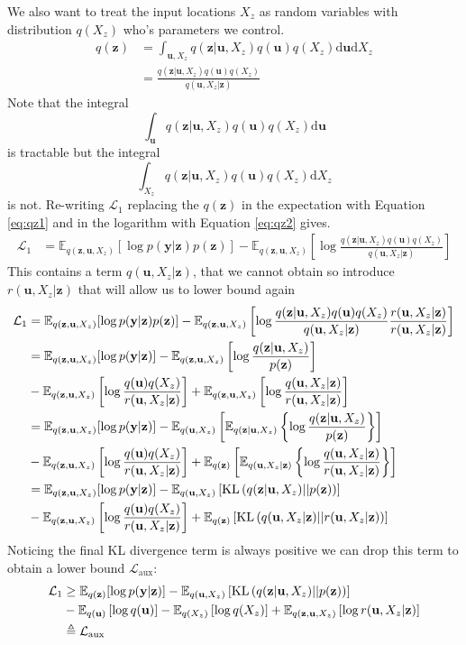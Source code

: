 \documentclass[12pt]{article}
\newcommand{\ub}{\mathbf{u}}
\newcommand{\zb}{\mathbf{z}}
\newcommand{\yb}{\mathbf{y}}
\newcommand{\dd}{\mathrm{d}}
\newcommand{\Lo}{\mathcal{L}_1}
\newcommand{\Laux}{\mathcal{L}_{\mathrm{aux}}}
\newcommand{\Ex}{\mathbb{E}}
\newcommand{\KL}{\mathrm{KL}}
\begin{document}
We also want to treat the input locations $X_z$ as random variables with distribution $q(X_z)$ who's parameters we control.
%
\begin{align}
q(\zb) &= \int_{\ub,X_z} q(\zb|\ub,X_z)q(\ub)q(X_z) \dd\ub \dd X_z \label{eq:qz1} \\
&= \frac{q(\zb|\ub,X_z)q(\ub)q(X_z)}{q(\ub,X_z|\zb)} \label{eq:qz2}
\end{align}
%
Note that the integral
%
\begin{equation}
\int_{\ub} q(\zb|\ub,X_z)q(\ub)q(X_z) \dd\ub
\end{equation}
%
is tractable but the integral
\begin{equation}
\int_{X_z} q(\zb|\ub,X_z)q(\ub)q(X_z) \dd X_z
\end{equation}
%
is not.
%
Re-writing $\Lo$ replacing the $q(\zb)$ in the expectation with Equation \ref{eq:qz1} and in the logarithm with Equation \ref{eq:qz2} gives.
%
\begin{align}
\Lo &= \Ex_{q(\zb,\ub,X_z)}[\log p(\yb|\zb)p(\zb)] - \Ex_{q(\zb,\ub,X_z)}\left[\log\frac{q(\zb|\ub,X_z)q(\ub)q(X_z)}{q(\ub,X_z|\zb)}\right]
\end{align}
%
This contains a term $q(\ub,X_z|\zb)$, that we cannot obtain so introduce $r(\ub,X_z|\zb)$ that will allow us to lower bound again
%
\begin{align}
\Lo &= \Ex_{q(\zb,\ub,X_z)}[\log p(\yb|\zb)p(\zb)] - \Ex_{q(\zb,\ub,X_z)}\left[\log\frac{q(\zb|\ub,X_z)q(\ub)q(X_z)}{q(\ub,X_z|\zb)}\frac{r(\ub,X_z|\zb)}{r(\ub,X_z|\zb)}\right] \\
&= \Ex_{q(\zb,\ub,X_z)}[\log p(\yb|\zb)] - \Ex_{q(\zb,\ub,X_z)}\left[\log\frac{q(\zb|\ub,X_z)}{p(\zb)}\right] \notag \\
&-\Ex_{q(\zb,\ub,X_z)}\left[\log\frac{q(\ub)q(X_z)}{r(\ub,X_z|\zb)}\right] + \Ex_{q(\zb,\ub,X_z)}\left[\log\frac{q(\ub,X_z|\zb)}{r(\ub,X_z|\zb)}\right] \\
&= \Ex_{q(\zb,\ub,X_z)}[\log p(\yb|\zb)] - \Ex_{q(\ub,X_z)}\left[\Ex_{q(\zb|\ub,X_z)}\left\{\log\frac{q(\zb|\ub,X_z)}{p(\zb)}\right\}\right] \notag \\
&-\Ex_{q(\zb,\ub,X_z)}\left[\log\frac{q(\ub)q(X_z)}{r(\ub,X_z|\zb)}\right] + \Ex_{q(\zb)}\left[\Ex_{q(\ub,X_z|\zb)}\left\{\log\frac{q(\ub,X_z|\zb)}{r(\ub,X_z|\zb)}\right\}\right] \\
&= \Ex_{q(\zb,\ub,X_z)}[\log p(\yb|\zb)] - \Ex_{q(\ub,X_z)}\left[\KL\left(q(\zb|\ub,X_z)||p(\zb)\right)\right] \notag \\
&-\Ex_{q(\zb,\ub,X_z)}\left[\log\frac{q(\ub)q(X_z)}{r(\ub,X_z|\zb)}\right] + \Ex_{q(\zb)}\left[\KL\left(q(\ub,X_z|\zb)||r(\ub,X_z|\zb)\right)\right]
\end{align}
%
Noticing the final KL divergence term is always positive we can drop this term to obtain a lower bound $\Laux:$
%
\begin{align}
\Lo &\ge \Ex_{q(\zb)}[\log p(\yb|\zb)] - \Ex_{q(\ub,X_z)}\left[\KL\left(q(\zb|\ub,X_z)||p(\zb)\right)\right] \notag \\
&-\Ex_{q(\ub)}\left[\log q(\ub)\right] - \Ex_{q(X_z)}\left[\log q(X_z)\right] + \Ex_{q(\zb,\ub,X_z)}\left[\log r(\ub,X_z|\zb)\right] \\
&\triangleq \Laux
\end{align}
%
\end{document}

